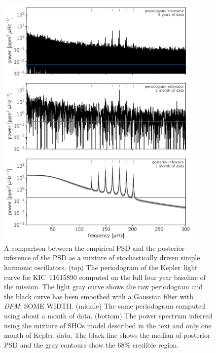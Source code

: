 \documentclass[manuscript, letterpaper]{aastex6}
\makeatletter
\let\origsubsection\subsection
\renewcommand\subsection{\@ifstar{\starsubsection}{\nostarsubsection}}
\newcommand\nostarsubsection[1]{\subsectionprelude\origsubsection{#1}}
\newcommand\starsubsection[1]{\subsectionprelude\origsubsection*{#1}}
\newcommand\subsectionprelude{\vspace{1em}}
\newcommand{\project}[1]{\textsf{#1}}
\newcommand{\kepler}{\project{Kepler}}
\newcommand{\figurelabel}[1]{\label{fig:#1}}
\newcommand{\todo}[3]{{\color{#2}\emph{#1}: #3}}
\newcommand{\dfmtodo}[1]{\todo{DFM}{red}{#1}}
\makeatother
\begin{document}
\begin{figure}[!htbp]
\begin{center}
\includegraphics[width=0.9\textwidth]{figures/astero-11615890-comparisons.pdf}
\caption{A comparison between the empirical PSD and the posterior inference of
the PSD as a mixture of stochastically driven simple harmonic oscillators.
(top) The periodogram of the \kepler\ light curve for KIC~11615890 computed
    on the full four year baseline of the mission.
    The light gray curve shows the raw periodogram and the black curve has
    been smoothed with a Gaussian filter with \dfmtodo{SOME WIDTH}.
(middle) The same periodogram computed using about a month of data.
(bottom) The power spectrum inferred using the mixture of SHOs model described
    in the text and only one month of \kepler\ data.
    The black line shows the median of posterior PSD and the gray contours
    show the 68\% credible region.
    \figurelabel{astero}}
\end{center}
\end{figure}

\subsection{Stellar rotation}
\end{document}
